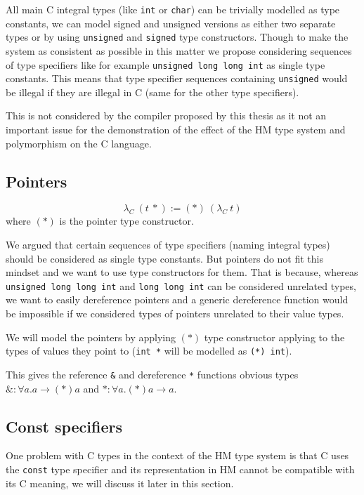 All main C integral types (like \lstinline{int} or \lstinline{char}) can be trivially modelled as type constants, we can model signed and unsigned versions as either two separate types or by using \lstinline{unsigned} and \lstinline{signed} type constructors. Though to make the system as consistent as possible in this matter we propose considering sequences of type specifiers like for example \lstinline{unsigned long long int} as single type constants. This means that type specifier sequences containing \lstinline{unsigned} would be illegal if they are illegal in C (same for the other type specifiers).

This is not considered by the compiler proposed by this thesis as it not an important issue for the demonstration of the effect of the HM type system and polymorphism on the C language. %

\subsection{Pointers}

\begin{defn}
	$$\lambda_C\ (t\ *) := (*)\ (\lambda_C\ t)$$
	where $(*)$ is the pointer type constructor.
\end{defn}

We argued that certain sequences of type specifiers (naming integral types) should be considered as single type constants. But pointers do not fit this mindset and we want to use type constructors for them. That is because, whereas \lstinline{unsigned long long int} and \lstinline{long long int} can be considered unrelated types, we want to easily dereference pointers and a generic dereference function would be impossible if we considered types of pointers unrelated to their value types.

We will model the pointers by applying $(*)$ type constructor applying to the types of values they point to (\lstinline{int *} will be modelled as \lstinline{(*) int}).

This gives the reference \lstinline{&} and dereference \lstinline{*} functions obvious types $\&: \forall a . a \rightarrow (*) a$ and $*: \forall a . (*) a \rightarrow a$.

\subsection{Const specifiers}

One problem with C types in the context of the HM type system is that C uses the \lstinline{const} type specifier and its representation in HM cannot be compatible with its C meaning, we will discuss it later in this section.

